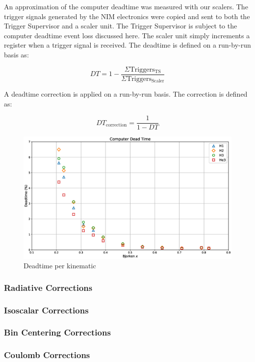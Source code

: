 An approximation of the computer deadtime was measured with our scalers. The trigger signals generated by the NIM electronics were copied and sent to both the Trigger Supervisor and a scaler unit. The Trigger Supervisor is subject to the computer deadtime event loss discussed here. The scaler unit simply increments a register when a trigger signal is received. The deadtime is defined on a run-by-run basis as:

\begin{equation}
DT = 1 - \frac{\Sigma \mathrm{Triggers_{TS}}}{\Sigma \mathrm{Triggers_{Scaler}}}
\end{equation}

A deadtime correction is applied on a run-by-run basis. The correction is defined as:

\begin{equation}
DT_{\mathrm{correction}} = \frac{1}{1-DT}
\end{equation}

\begin{figure}
	\includegraphics[width=\textwidth]{./chap3-analysis/fig/deadtime.eps}
	\caption{Deadtime per kinematic}
	\label{fig:deadtime}
\end{figure}

\subsubsection{Radiative Corrections}

\subsubsection{Isoscalar Corrections}

\subsubsection{Bin Centering Corrections}

\subsubsection{Coulomb Corrections}